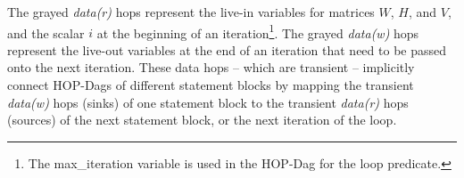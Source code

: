 The grayed \textit{data(r)} hops represent the live-in variables for matrices
$W$, $H$, and $V$, and the scalar $i$ at the beginning of an
iteration\footnote{The max\_iteration variable is used in the HOP-Dag
for the  loop predicate.}. The grayed \textit{data(w)} hops
represent the live-out variables at the end of an iteration that need
to be passed onto the next iteration. These data hops -- which are
transient -- implicitly connect HOP-Dags of different statement blocks
by mapping the transient \textit{data(w)} hops (sinks) of
one statement block to the transient \textit{data(r)} hops (sources) of the next statement 
block, or the next iteration of the  loop.

